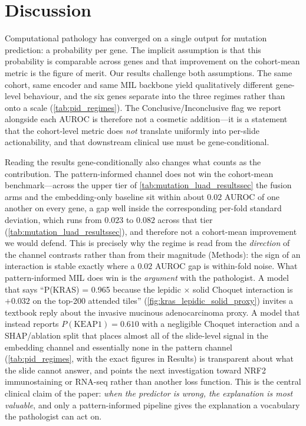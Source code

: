 \section*{Discussion}

Computational pathology has converged on a single output for
mutation prediction: a probability per gene.
The implicit assumption is that this probability is comparable
across genes and that improvement on the cohort-mean metric is
the figure of merit.
Our results challenge both assumptions.
The same cohort, same encoder and same MIL backbone yield
qualitatively different gene-level behaviour, and the six genes
separate into the three regimes rather than onto a scale
(\cref{tab:pid_regimes}).
The Conclusive/Inconclusive flag we report alongside each AUROC
is therefore not a cosmetic addition---it is a statement that
the cohort-level metric does \emph{not} translate uniformly into
per-slide actionability, and that downstream clinical use must
be gene-conditional.

Reading the results gene-conditionally also changes what counts as
the contribution.
The pattern-informed channel does not win the cohort-mean
benchmark---across the upper tier of
\cref{tab:mutation_luad_resultssec} the fusion arms and the
embedding-only baseline sit within about $0.02$ AUROC of one another
on every gene, a gap well inside the corresponding per-fold standard
deviation, which runs from $0.023$ to $0.082$ across that tier
(\cref{tab:mutation_luad_resultssec}), and therefore not a cohort-mean
improvement we would defend.
This is precisely why the regime is read from the \emph{direction} of the
channel contrasts rather than from their magnitude (Methods): the sign of an
interaction is stable exactly where a $0.02$ AUROC gap is within-fold noise.
What pattern-informed MIL does win is the \emph{argument} with the
pathologist.
A model that says ``P(KRAS) = 0.965 because the
lepidic$\,\times\,$solid Choquet interaction is $+0.032$ on the
top-200 attended tiles'' (\cref{fig:kras_lepidic_solid_proxy})
invites a textbook reply about the
invasive mucinous adenocarcinoma proxy.
A model that instead reports $P(\text{KEAP1}) = 0.610$ with a
negligible Choquet interaction and a SHAP/ablation split that places
almost all of the slide-level signal in the embedding channel and
essentially none in the pattern channel
(\cref{tab:pid_regimes}, with the exact figures in Results) is transparent
about what the slide cannot answer, and points the next investigation
toward NRF2 immunostaining or RNA-seq rather than another loss
function.
This is the central clinical claim of the paper: \emph{when the
predictor is wrong, the explanation is most valuable}, and only a
pattern-informed pipeline gives the explanation a vocabulary the
pathologist can act on.\cite{rudin2019stop,holzinger2019causability}


